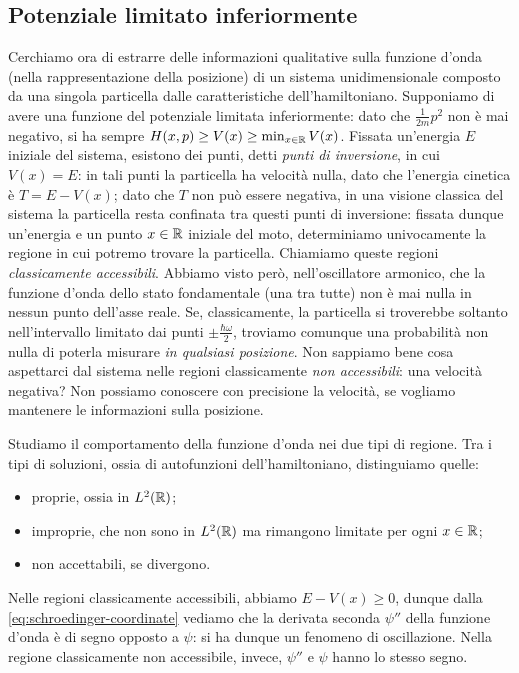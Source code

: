 \subsection{Potenziale limitato inferiormente}
Cerchiamo ora di estrarre delle informazioni qualitative sulla funzione d'onda (nella rappresentazione della posizione) di un sistema unidimensionale composto da una singola particella dalle caratteristiche dell'hamiltoniano.
Supponiamo di avere una funzione del potenziale limitata inferiormente: dato che $\frac1{2m}p^2$ non è mai negativo, si ha sempre $H(x,p)\ge V(x)\ge\min_{x\in\R}V(x)$.
Fissata un'energia $E$ iniziale del sistema, esistono dei punti, detti \emph{punti di inversione}, in cui $V(x)=E$: in tali punti la particella ha velocità nulla, dato che l'energia cinetica è $T=E-V(x)$; dato che $T$ non può essere negativa, in una visione classica del sistema la particella resta confinata tra questi punti di inversione: fissata dunque un'energia e un punto $x\in\R$ iniziale del moto, determiniamo univocamente la regione in cui potremo trovare la particella.
Chiamiamo queste regioni \emph{classicamente accessibili}.
Abbiamo visto però, nell'oscillatore armonico, che la funzione d'onda dello stato fondamentale (una tra tutte) non è mai nulla in nessun punto dell'asse reale.
Se, classicamente, la particella si troverebbe soltanto nell'intervallo limitato dai punti $\pm\frac{\hbar\omega}2$, troviamo comunque una probabilità non nulla di poterla misurare \emph{in qualsiasi posizione}.
Non sappiamo bene cosa aspettarci dal sistema nelle regioni classicamente \emph{non accessibili}: una velocità negativa?
Non possiamo conoscere con precisione la velocità, se vogliamo mantenere le informazioni sulla posizione.

Studiamo il comportamento della funzione d'onda nei due tipi di regione.
Tra i tipi di soluzioni, ossia di autofunzioni dell'hamiltoniano, distinguiamo quelle:
\begin{itemize}
	\item proprie, ossia in $\leb[2]{\R}$;
	\item improprie, che non sono in $\leb[2]{\R}$ ma rimangono limitate per ogni $x\in\R$;
	\item non accettabili, se divergono.
\end{itemize}
Nelle regioni classicamente accessibili, abbiamo $E-V(x)\ge 0$, dunque dalla \eqref{eq:schroedinger-coordinate} vediamo che la derivata seconda $\psi''$ della funzione d'onda è di segno opposto a	$\psi$: si ha dunque un fenomeno di oscillazione.
Nella regione classicamente non accessibile, invece, $\psi''$ e $\psi$ hanno lo stesso segno.

